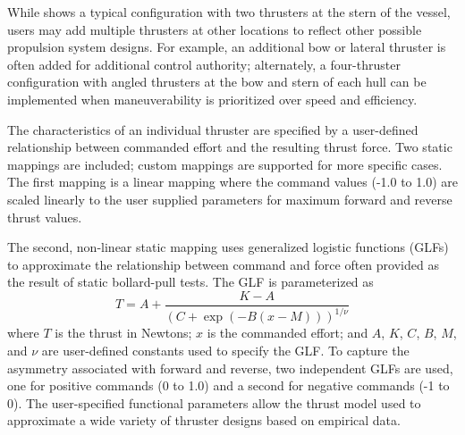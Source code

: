 \documentclass[utf8]{frontiersSCNS} %
\begin{document}
While  shows a typical configuration with two thrusters at the stern of the vessel, users may add multiple thrusters at other locations to reflect other possible propulsion system designs. For example, an additional bow or lateral thruster is often added for additional control authority; alternately, a four-thruster configuration with angled thrusters at the bow and stern of each hull can be implemented when maneuverability is prioritized over speed and efficiency. 

The characteristics of an individual thruster are specified by a user-defined relationship between commanded effort and the resulting thrust force. Two static mappings are included; custom mappings are supported for more specific cases. The first mapping is a linear mapping where the command values (-1.0 to 1.0) are scaled linearly to the user supplied parameters for maximum forward and reverse thrust values. 

The second, non-linear static mapping uses generalized logistic functions (GLFs) to approximate the relationship between command and force often provided as the result of static bollard-pull tests. The GLF is parameterized as 
\begin{equation}
  T = A + \frac{K-A}{\left(C+\exp(-B(x-M))\right)^{1/\nu}}
  \label{e:glf}
\end{equation}
where $T$ is the thrust in Newtons; $x$ is the commanded effort; and $A$, $K$, $C$, $B$, $M$, and $\nu$ are user-defined constants used to specify the GLF. To capture the asymmetry associated with forward and reverse, two independent GLFs are used, one for positive commands (0 to 1.0) and a second for negative commands (-1 to 0). The user-specified functional parameters allow the thrust model used to approximate a wide variety of thruster designs based on empirical data.
\end{document}
